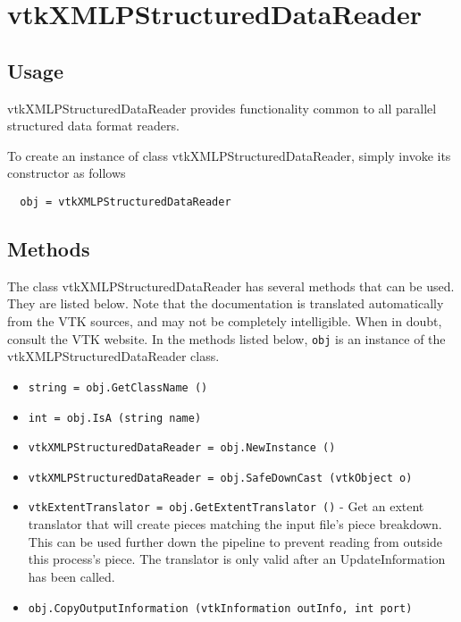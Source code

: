 \section{vtkXMLPStructuredDataReader}

\subsection{Usage}

 vtkXMLPStructuredDataReader provides functionality common to all
 parallel structured data format readers.

To create an instance of class vtkXMLPStructuredDataReader, simply
invoke its constructor as follows
\begin{verbatim}
  obj = vtkXMLPStructuredDataReader
\end{verbatim}
\subsection{Methods}

The class vtkXMLPStructuredDataReader has several methods that can be used.
  They are listed below.
Note that the documentation is translated automatically from the VTK sources,
and may not be completely intelligible.  When in doubt, consult the VTK website.
In the methods listed below, \verb|obj| is an instance of the vtkXMLPStructuredDataReader class.
\begin{itemize}
\item  \verb|string = obj.GetClassName ()|

\item  \verb|int = obj.IsA (string name)|

\item  \verb|vtkXMLPStructuredDataReader = obj.NewInstance ()|

\item  \verb|vtkXMLPStructuredDataReader = obj.SafeDownCast (vtkObject o)|

\item  \verb|vtkExtentTranslator = obj.GetExtentTranslator ()| -  Get an extent translator that will create pieces matching the
 input file's piece breakdown.  This can be used further down the
 pipeline to prevent reading from outside this process's piece.
 The translator is only valid after an UpdateInformation has been
 called.

\item  \verb|obj.CopyOutputInformation (vtkInformation outInfo, int port)|

\end{itemize}
